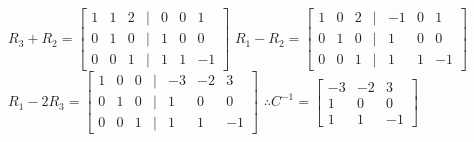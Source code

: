 \documentclass[a4paper]{article}
\begin{document}
$R_3 + R_2 = \begin{bmatrix}
1&1&2&|&0&0&1\\
0&1&0&|&1&0&0\\
0&0&1&|&1&1&-1
\end{bmatrix}$ $R_1 - R_2 = \begin{bmatrix}
1&0&2&|&-1&0&1\\
0&1&0&|&1&0&0\\
0&0&1&|&1&1&-1
\end{bmatrix}$\\
$R_1 - 2R_3 = \begin{bmatrix}
1&0&0&|&-3&-2&3\\
0&1&0&|&1&0&0\\
0&0&1&|&1&1&-1
\end{bmatrix}$ $\therefore C^{-1} = \begin{bmatrix}
-3&-2&3\\
1&0&0\\
1&1&-1
\end{bmatrix}$\\
\end{document}
